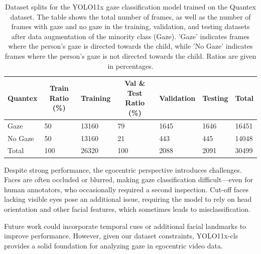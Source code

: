 \documentclass[
  man,floatsintext]{apa6}
\begin{document}
\begin{table}[tbp]

\begin{center}
\begin{threeparttable}

\caption{\label{tab:gaze-dataset-splits-short}Dataset splits for the YOLO11x gaze classification model trained on the Quantex dataset. The table shows the total number of frames, as well as the number of frames with gaze and no gaze in the training, validation, and testing datasets after data augmentation of the minority class (Gaze). 'Gaze' indicates frames where the person's gaze is directed towards the child, while 'No Gaze' indicates frames where the person's gaze is not directed towards the child. Ratios are given in percentages.}

\begin{tabular}{lllllll}
\toprule
Quantex & \multicolumn{1}{c}{Train Ratio (\%)} & \multicolumn{1}{c}{Training} & \multicolumn{1}{c}{Val \& Test Ratio (\%)} & \multicolumn{1}{c}{Validation} & \multicolumn{1}{c}{Testing} & \multicolumn{1}{c}{Total}\\
\midrule
Gaze & 50 & 13160 & 79 & 1645 & 1646 & 16451\\
No Gaze & 50 & 13160 & 21 & 443 & 445 & 14048\\
Total & 100 & 26320 & 100 & 2088 & 2091 & 30499\\
\bottomrule
\end{tabular}

\end{threeparttable}
\end{center}

\end{table}

Despite strong performance, the egocentric perspective introduces challenges. Faces are often occluded or blurred, making gaze classification difficult---even for human annotators, who occasionally required a second inspection. Cut-off faces lacking visible eyes pose an additional issue, requiring the model to rely on head orientation and other facial features, which sometimes leads to misclassification.

Future work could incorporate temporal cues or additional facial landmarks to improve performance. However, given our dataset constraints, YOLO11x-cls provides a solid foundation for analyzing gaze in egocentric video data.
\end{document}
